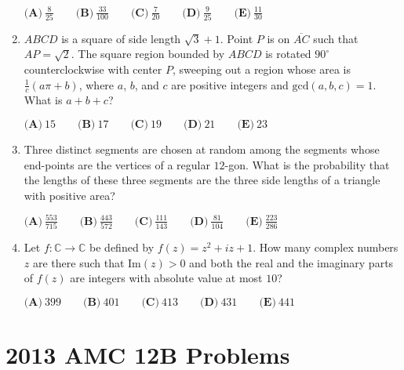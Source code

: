\documentclass{article}
\begin{document}
\begin{enumerate}[label=\arabic*., itemsep=0.5em]
\( \textbf{(A)} \ \frac{8}{25} \qquad \textbf{(B)} \ \frac{33}{100} \qquad \textbf{(C)} \ \frac{7}{20} \qquad \textbf{(D)} \ \frac{9}{25} \qquad \textbf{(E)} \ \frac{11}{30}\)\par \vspace{0.5em}\item \( ABCD\) is a square of side length \( \sqrt{3} + 1 \). Point \( P \) is on \( \overline{AC} \) such that \( AP = \sqrt{2} \). The square region bounded by \( ABCD \) is rotated \( 90^{\circ} \) counterclockwise with center \( P \), sweeping out a region whose area is \( \frac{1}{c} (a \pi + b) \), where \(a \), \(b\), and \( c \) are positive integers and \( \text{gcd}(a,b,c) = 1 \). What is \( a + b + c \)?

\(\textbf{(A)} \ 15 \qquad \textbf{(B)} \ 17 \qquad \textbf{(C)} \ 19 \qquad \textbf{(D)} \ 21 \qquad \textbf{(E)} \ 23 \)\par \vspace{0.5em}\item Three distinct segments are chosen at random among the segments whose end-points are the vertices of a regular \(12\)-gon. What is the probability that the lengths of these three segments are the three side lengths of a triangle with positive area?

\( \textbf{(A)} \ \frac{553}{715} \qquad \textbf{(B)} \ \frac{443}{572} \qquad \textbf{(C)} \ \frac{111}{143} \qquad \textbf{(D)} \ \frac{81}{104} \qquad \textbf{(E)} \ \frac{223}{286}\)\par \vspace{0.5em}\item Let \(f : \mathbb{C} \to \mathbb{C} \) be defined by \( f(z) = z^2 + iz + 1 \). How many complex numbers \(z \) are there such that \( \text{Im}(z) > 0 \) and both the real and the imaginary parts of \(f(z)\) are integers with absolute value at most \( 10 \)?

\( \textbf{(A)} \ 399 \qquad \textbf{(B)} \ 401 \qquad \textbf{(C)} \ 413 \qquad \textbf{(D)} \ 431 \qquad \textbf{(E)} \ 441 \)\par \vspace{0.5em}\end{enumerate}\newpage\section*{2013 AMC 12B Problems}
\end{document}
